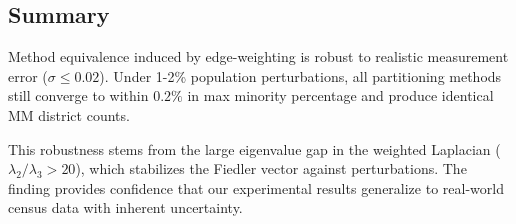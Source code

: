 \subsection{Summary}

Method equivalence induced by edge-weighting is robust to realistic measurement error ($\sigma \leq 0.02$). Under 1-2\% population perturbations, all partitioning methods still converge to within $0.2\%$ in max minority percentage and produce identical MM district counts.

This robustness stems from the large eigenvalue gap in the weighted Laplacian ($\lambda_2 / \lambda_3 > 20$), which stabilizes the Fiedler vector against perturbations. The finding provides confidence that our experimental results generalize to real-world census data with inherent uncertainty.
